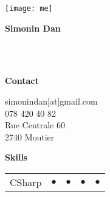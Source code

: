 \texttt{[image: me]}

\begin{center}
    \textbf{Simonin Dan}
\end{center}

 \\
 \\

\begin{center}
    \textbf{Contact}
\end{center}

simonindan[at]gmail.com \\
078 420 40 82 \\
Rue Centrale 60 \\
2740 Moutier \\

\begin{center}
    \textbf{Skills}
\end{center}


\begin{tabular}{p{}|p{}|p{}|p{}|p{}}
    CSharp & $\bullet$ & $\bullet$ & $\bullet$ & $\bullet$
\end{tabular}